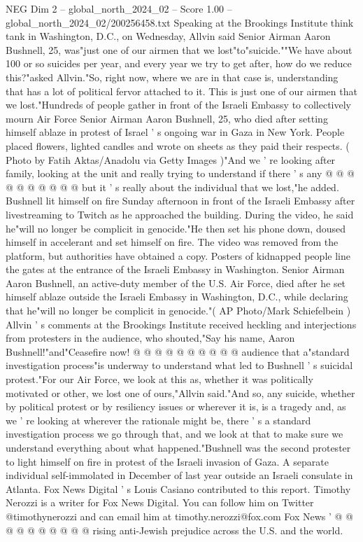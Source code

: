 \begin{textsample}{NEG Dim 2 – global\_north\_2024\_02 – Score 1.00 – global\_north\_2024\_02/200256458.txt}  \label{ex:f2_neg_300}
Speaking at the Brookings Institute think tank in Washington, D.C., on Wednesday, Allvin said Senior Airman Aaron Bushnell, 25, was"just one of our airmen that we lost"to"suicide.""We have about 100 or so suicides per year, and every year we try to get after, how do we reduce this?"asked Allvin."So, right now, where we are in that case is, understanding that has a lot of political fervor attached to it.
This is just one of our airmen that we lost."Hundreds of people gather in front of the Israeli Embassy to collectively mourn Air Force Senior Airman Aaron Bushnell, 25, who died after setting himself ablaze in protest of Israel ' s ongoing war in Gaza in New York.
People placed flowers, lighted candles and wrote on sheets as they paid their respects. ( Photo by Fatih Aktas/Anadolu via Getty Images )"And we ' re looking after family, looking at the unit and really trying to understand if there ' s any @ @ @ @ @ @ @ @ @ @ but it ' s really about the individual that we lost,"he added.
Bushnell lit himself on fire Sunday afternoon in front of the Israeli Embassy after livestreaming to Twitch as he approached the building.
During the video, he said he"will no longer be complicit in genocide."He then set his phone down, doused himself in accelerant and set himself on fire.
The video was removed from the platform, but authorities have obtained a copy.
Posters of kidnapped people line the gates at the entrance of the Israeli Embassy in Washington.
Senior Airman Aaron Bushnell, an active-duty member of the U.S.
Air Force, died after he set himself ablaze outside the Israeli Embassy in Washington, D.C., while declaring that he"will no longer be complicit in genocide."( AP Photo/Mark Schiefelbein ) Allvin ' s comments at the Brookings Institute received heckling and interjections from protesters in the audience, who shouted,"Say his name, Aaron Bushnell!"and"Ceasefire now! @ @ @ @ @ @ @ @ @ @ audience that a"standard investigation process"is underway to understand what led to Bushnell ' s suicidal protest."For our Air Force, we look at this as, whether it was politically motivated or other, we lost one of ours,"Allvin said."And so, any suicide, whether by political protest or by resiliency issues or wherever it is, is a tragedy and, as we ' re looking at wherever the rationale might be, there ' s a standard investigation process we go through that, and we look at that to make sure we understand everything about what happened."Bushnell was the second protester to light himself on fire in protest of the Israeli invasion of Gaza.
A separate individual self-immolated in December of last year outside an Israeli consulate in Atlanta.
Fox News Digital ' s Louis Casiano contributed to this report.
Timothy Nerozzi is a writer for Fox News Digital.
You can follow him on Twitter @timothynerozzi and can email him at timothy.nerozzi@fox.com Fox News ' @ @ @ @ @ @ @ @ @ @ rising anti-Jewish prejudice across the U.S. and the world.

\end{textsample}
